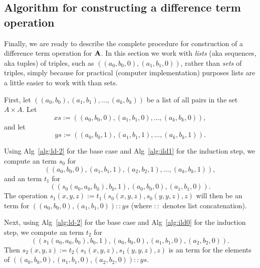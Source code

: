 \subsection{Algorithm for constructing a difference term operation}
\label{sec:algor-2}
Finally, we are ready to describe the complete procedure for construction
of a difference term operation for $\mathbf{A}$.  
In this section we work with \emph{lists} 
(aka sequences, aka tuples) of triples, 
such as $((a_0, b_0, 0), (a_1, b_1, 0))$, rather than \emph{sets} of triples,
simply because for practical (computer implementation) purposes lists are a little 
easier to work with than sets.

First, let 
$((a_0, b_0), (a_1, b_1), \dots, (a_k, b_k))$ 
be a list of all pairs in the set $A\times A$.
Let 
\begin{equation*}
xs := %
((a_0, b_0, 0), (a_1, b_1, 0), \dots, (a_k, b_k, 0)), 
\end{equation*}
and let 
\begin{equation*}
ys := %
((a_0, b_0, 1), (a_1, b_1, 1), \dots, (a_k, b_k, 1)). 
\end{equation*}


Using Alg~\ref{alg:ld-2} for the base case 
and Alg~\ref{alg:ild1}
for the induction step,
we compute an \ld term $s_0$ for
\begin{equation*}
((a_0, b_0, 0), (a_1, b_1, 1), (a_2, b_2, 1), \dots, (a_k, b_k, 1)),  
\end{equation*}
and an \ld term $t_1$ for
\begin{equation*}
((s_0(a_0, a_0, b_0), b_0, 1), (a_0, b_0, 0),(a_1, b_1, 0)). 
\end{equation*}
The operation $s_1(x,y,z) := t_1(s_0(x,y,z), s_0(y,y,z), z)$ will then be
an \ld term for
$((a_0, b_0, 0), (a_1, b_1, 0)) :: ys$  (where $::$ denotes
list concatenation).

Next, using Alg~\ref{alg:ld-2} for the base case
and Alg~\ref{alg:ild0} for the induction step,
we compute an \ld term $t_2$ for
\begin{equation*}
((s_1(a_0, a_0, b_0), b_0, 1), (a_0, b_0, 0),(a_1, b_1, 0),(a_2, b_2, 0)). 
\end{equation*}
Then $s_2(x,y,z) := t_2(s_1(x,y,z), s_1(y,y,z), z)$ is an \ld term
for the elements of
$((a_0, b_0, 0), (a_1, b_1, 0), (a_2, b_2, 0)) :: ys$.

